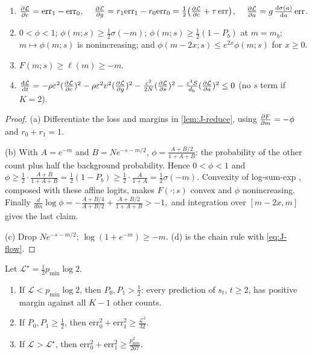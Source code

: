 \begin{lemma}[Derivatives]
\label{lem:J-geometry}
\begin{enumerate}[label=(\alph*),leftmargin=*,itemsep=2pt,topsep=3pt]
\item $\pd{\mathcal L}{c}=\mathrm{err}_1-\mathrm{err}_0$, $\quad\pd{\mathcal L}{g}=r_1\mathrm{err}_1-r_0\mathrm{err}_0=\tfrac{1}{2}\bigl(\pd{\mathcal L}{c}+\tau\,\mathrm{err}\bigr)$, $\quad\pd{\mathcal L}{a}=g\,\dd{\sigma(a)}{a}\,\mathrm{err}$.
\item $0<\phi<1$; $\phi(m;s)\ge\frac{1}{2}\sigma(-m)$; $\phi(m;s)\ge\frac{1}{2}(1-P_b)$ at $m=m_b$; $m\mapsto\phi(m;s)$ is nonincreasing; and
$\phi(m-2x;s)\le e^{2x}\phi(m;s)$ for $x\ge0$.
\item $F(m;s)\ge\ell(m)\ge-m$.
\item $\ddt{\mathcal L}=-\rho\initscale^2(\pd{\mathcal L}{c})^2-\rho\initscale^2v^2(\pd{\mathcal L}{g})^2-\frac{\initscale^2}{2N}(\pd{\mathcal L}{s})^2-\frac{\initscale^4S}{d_{\mathrm h}}(\pd{\mathcal L}{a})^2\le0$ (no $s$ term if $K=2$).
\end{enumerate}
\end{lemma}

\begin{proof}
(a) Differentiate the loss and margins in \cref{lem:J-reduce}, using
$\pd{F}{m}=-\phi$ and $r_0+r_1=1$.

(b) With $A=e^{-m}$ and $B=Ne^{-s-m/2}$, $\phi=\frac{A+B/2}{1+A+B}$: the probability of the other count plus half the background
probability. Hence $0<\phi<1$ and
 $\phi\ge\frac{1}{2}\cdot\frac{A+B}{1+A+B}=\frac{1}{2}(1-P_b)\ge\frac{1}{2}\cdot\frac{A}{1+A}=\frac{1}{2}\sigma(-m).$ 
Convexity of log-sum-exp \citep[Section~3.1.5]{boyd2004convex}, composed with these affine logits, makes $F(\cdot;s)$ convex and $\phi$ nonincreasing. Finally
 $\frac{d}{dm}\log\phi=-\frac{A+B/4}{A+B/2}+\frac{A+B/2}{1+A+B}>-1,$ 
and integration over $[m-2x,m]$ gives the last claim.

(c) Drop $Ne^{-s-m/2}$; $\log(1+e^{-m})\ge-m$. (d) is the chain rule with \cref{eq:J-flow}.
\end{proof}

\begin{lemma}
\label{lem:J-levels}
Let $\mathcal L^\star=\frac{1}{2}p_{\min}\log2$.
\begin{enumerate}[label=(\alph*),leftmargin=*,itemsep=2pt,topsep=3pt]
\item If $\mathcal L<p_{\min}\log2$, then $P_0,P_1>\frac{1}{2}$: every prediction of $s_t$, $t\ge2$, has positive margin against all $K-1$ other counts.
\item If $P_0,P_1\ge\frac{1}{2}$, then $\mathrm{err}_0^2+\mathrm{err}_1^2\ge \frac{\mathcal L^2}{32}$.
\item If $\mathcal L>\mathcal L^\star$, then $\mathrm{err}_0^2+\mathrm{err}_1^2\ge \frac{p_{\min}^2}{267}$.
\end{enumerate}
\end{lemma}

